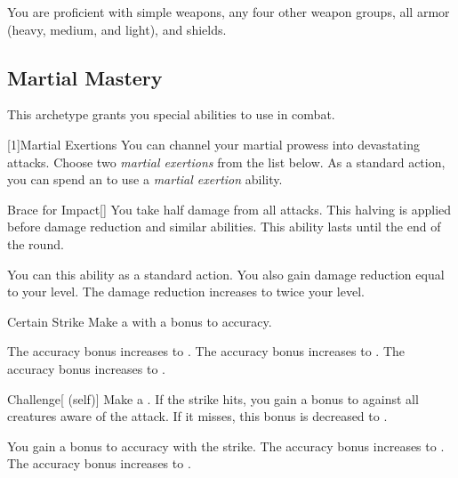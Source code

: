         You are proficient with simple weapons, any four other weapon groups, all armor (heavy, medium, and light), and shields.

    \subsection{Martial Mastery}
        This archetype grants you special abilities to use in combat.

        [1]{Martial Exertions}
        You can channel your martial prowess into devastating attacks.
        Choose two \textit{martial exertions} from the list below.
        As a standard action, you can spend an  to use a \textit{martial exertion} ability.
        {
            \begin{ability}{Brace for Impact}[]
                You take half damage from all attacks.
                This halving is applied before damage reduction and similar abilities.
                This ability lasts until the end of the round.

                \rankline
                 You can  this ability as a standard action.
                 You also gain damage reduction equal to your level.
                 The damage reduction increases to twice your level.
            \end{ability}

            \begin{ability}{Certain Strike}
                Make a  with a  bonus to accuracy.

                \rankline
                 The accuracy bonus increases to .
                 The accuracy bonus increases to .
                 The accuracy bonus increases to .
            \end{ability}

            \begin{ability}{Challenge}[ (self)]
                Make a .
                If the strike hits, you gain a  bonus to  against all creatures aware of the attack.
                If it misses, this bonus is decreased to .

                \rankline
                 You gain a  bonus to accuracy with the strike.
                 The accuracy bonus increases to .
                 The accuracy bonus increases to .
            \end{ability}

}
